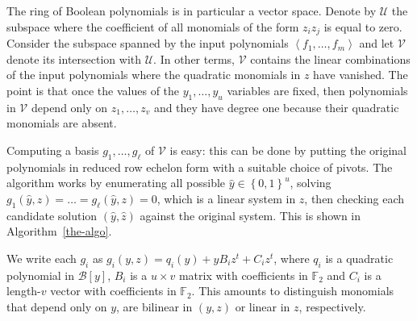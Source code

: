 \documentclass[a4paper,UKenglish,cleveref, autoref]{lipics-v2019}
\newcommand{\bits}{\left\{0, 1\right\}}
\newcommand{\red}{\color{red}}
\newcommand{\TODO}[1]{{\red \textbf{TODO}:} #1\xspace}
\begin{document}
	
	The ring of Boolean polynomials is in particular a vector space. Denote by
	$\mathcal{U}$ the subspace where the coefficient of all monomials of the form
	$z_i z_j$ is equal to zero. Consider the subspace spanned by the input
	polynomials $\left\langle f_1, \dots, f_m\right\rangle$ and let $\mathcal{V}$
	denote its intersection with $\mathcal{U}$. In other terms, $\mathcal{V}$
	contains the linear combinations of the input polynomials where the quadratic
	monomials in $z$ have vanished. The point is that once the values of the
	$y_1, \dots, y_u$ variables are fixed, then polynomials in $\mathcal{V}$ depend
	only on $z_1, \dots, z_v$ and they have degree one because their quadratic
	monomials are absent.
	
	Computing a basis $g_1, \dots, g_\ell$ of $\mathcal{V}$ is easy: this can be
	done by putting the original polynomials in reduced row echelon form with a
	suitable choice of pivots. The algorithm works by enumerating all possible
	$\hat y \in \bits^u$, solving $g_1(\hat y, z) = \dots = g_\ell(\hat y, z) = 0$,
	which is a linear system in $z$, then checking each candidate solution
	$(\hat y, \hat z)$ against the original system. This is shown in
	Algorithm~\ref{the-algo}.
	
	We write each $g_i$ as $g_i(y, z) = q_i(y) + y B_i z^t + C_i z^t$, where $q_i$
	is a quadratic polynomial in $\mathcal{B}[y]$, $B_i$ is a $u \times v$ matrix
	with coefficients in $\mathbb{F}_2$ and $C_i$ is a length-$v$ vector with
	coefficients in $\mathbb{F}_2$. This amounts to distinguish monomials that
	depend only on $y$, are bilinear in $(y, z)$ or linear in $z$, respectively.
	
\end{document}
